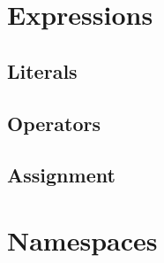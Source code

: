\section{Expressions}

\subsection{Literals}

\subsection{Operators}

\subsection{Assignment}

\section{Namespaces}